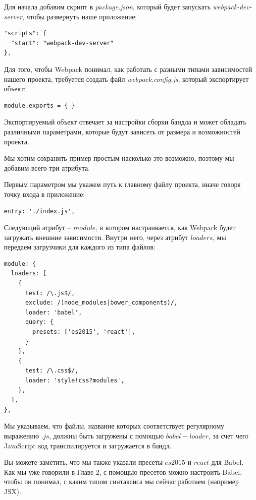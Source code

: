 Для начала добавим скрипт в \textit{package.json}, который будет запускать \textit{webpack-dev-server}, чтобы развернуть наше приложение:

\begin{lstlisting}
"scripts": {
  "start": "webpack-dev-server"
},
\end{lstlisting}

Для того, чтобы Webpack понимал, как работать с разными типами зависимостей нашего проекта, требуется создать файл \textit{webpack.config.js}, который экспортирует объект:

\begin{lstlisting}
module.exports = { }
\end{lstlisting}

Экспортируемый объект отвечает за настройки сборки бандла и может обладать различными параметрами, которые будут зависеть от размера и возможностей проекта.

Мы хотим сохранить пример простым насколько это возможно, поэтому мы добавим всего три атрибута.

Первым параметром мы укажем путь к главному файлу проекта, иначе говоря точку входа в приложение:

\begin{lstlisting}
entry: './index.js',
\end{lstlisting}

Следующий атрибут -- $module$, в котором настраивается, как Webpack будет загружать внешние зависимости. Внутри него, через атрибут $loaders$, мы передаем загрузчики для каждого из типа файлов:

\begin{lstlisting}
module: {
  loaders: [
    {
      test: /\.js$/,
      exclude: /(node_modules|bower_components)/,
      loader: 'babel',
      query: {
        presets: ['es2015', 'react'],
      }
    }, 
    {
      test: /\.css$/,
      loader: 'style!css?modules',
    },
  ],
},
\end{lstlisting}
 
Мы указываем, что файлы, название которых соответствует регулярному выражению $.js$, должны быть загружены с помощью $babel-loader$, за счет чего JavaScript код транспилируется и загружается в бандл.

Вы можете заметить, что мы также указали пресеты $es2015$ и $react$ для Babel. Как мы уже говорили в Главе 2, с помощью пресетов можно настроить Babel, чтобы он понимал, с каким типом синтаксиса мы сейчас работаем (например JSX).


